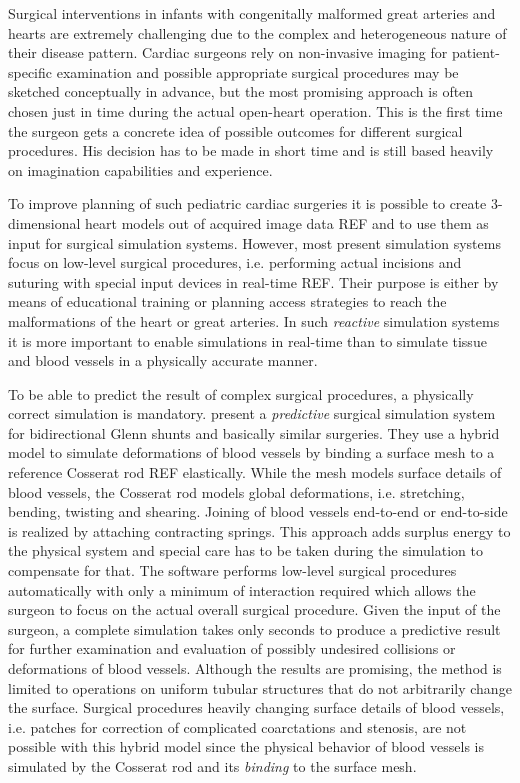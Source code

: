 Surgical interventions in infants with congenitally malformed great arteries and hearts are extremely challenging due to the complex and heterogeneous nature of their disease pattern. Cardiac surgeons rely on non-invasive imaging for patient-specific examination and possible appropriate surgical procedures may be sketched conceptually in advance, but the most promising approach is often chosen just in time during the actual open-heart operation. This is the first time the surgeon gets a concrete idea of possible outcomes for different surgical procedures. His decision has to be made in short time and is still based heavily on imagination capabilities and experience.

To improve planning of such pediatric cardiac surgeries it is possible to create 3-dimensional heart models out of acquired image data REF and to use them as input for surgical simulation systems. However, most present simulation systems focus on low-level surgical procedures, i.e. performing actual incisions and suturing with special input devices in real-time REF. Their purpose is either by means of educational training or planning access strategies to reach the malformations of the heart or great arteries. In such {\itshape reactive} simulation systems it is more important to enable simulations in real-time than to simulate tissue and blood vessels in a physically accurate manner.

To be able to predict the result of complex surgical procedures, a physically correct simulation is mandatory. \cite{Li2009} present a {\itshape predictive} surgical simulation system for bidirectional Glenn shunts and basically similar surgeries. They use a hybrid model to simulate deformations of blood vessels by binding a surface mesh to a reference Cosserat rod REF elastically. While the mesh models surface details of blood vessels, the Cosserat rod models global deformations, i.e. stretching, bending, twisting and shearing. Joining of blood vessels end-to-end or end-to-side is realized by attaching contracting springs. This approach adds surplus energy to the physical system and special care has to be taken during the simulation to compensate for that. The software performs low-level surgical procedures automatically with only a minimum of interaction required which allows the surgeon to focus on the actual overall surgical procedure. Given the input of the surgeon, a complete simulation takes only seconds to produce a predictive result for further examination and evaluation of possibly undesired collisions or deformations of blood vessels. Although the results are promising, the method is limited to operations on uniform tubular structures that do not arbitrarily change the surface. Surgical procedures heavily changing surface details of blood vessels, i.e. patches for correction of complicated coarctations and stenosis, are not possible with this hybrid model since the physical behavior of blood vessels is simulated by the Cosserat rod and its {\itshape binding} to the surface mesh.

